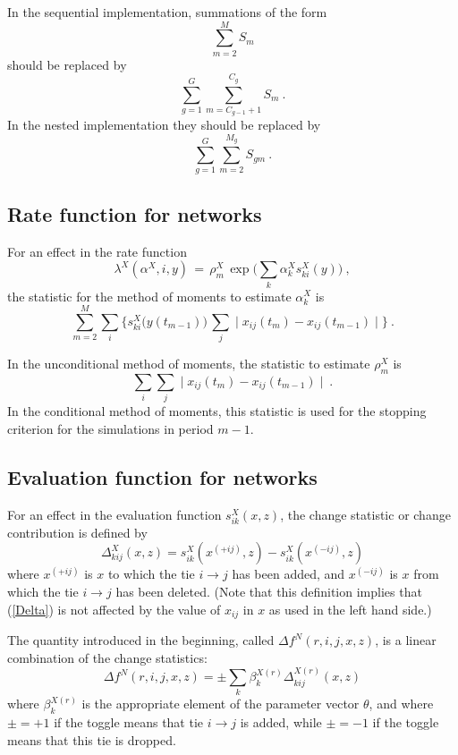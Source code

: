 \documentclass[a4paper,12pt,fleqn]{article}
\begin{document}
In the sequential implementation, summations of the form
\[
\sum_{m=2}^M S_m
\]
should be replaced by
\[
\sum_{g=1}^G \sum_{m=C_{g-1}+1}^{C_g} S_m \ .
\]
In the nested implementation they should be replaced by
\[
\sum_{g=1}^G \sum_{m=2}^{M_g} S_{gm} \ .
\]


\subsection{Rate function for networks}

For an effect in the rate function
\begin{equation}
 \lambda^X(\alpha^X, i, y) \,=\, \rho^X_m \,
      \exp\Big(\sum_k \alpha^X_k s^X_{ki}(y) \Big) \ ,
               \label{ratef}
\end{equation}
the statistic for the method of moments to estimate $\alpha_k^X$ is
\begin{equation}
\sum_{m=2}^M  \sum_i \bigg\{ s^X_{ki}\big(y(t_{m-1})\big) \,
         \sum_j \mid x_{ij}(t_m) - x_{ij}(t_{m-1}) \mid  \bigg\} \ .
               \label{ratestat}
\end{equation}

In the unconditional method of moments, the statistic to estimate
$\rho^X_m$ is
\begin{equation}
 \sum_i \sum_j \mid x_{ij}(t_m) - x_{ij}(t_{m-1}) \mid  \ .
               \label{rhostat}
\end{equation}
In the conditional method of moments, this statistic is used for
the stopping criterion for the simulations in period $m-1$.

\subsection{Evaluation function for networks}

For an effect in the evaluation function
$s_{ik}^X(x,z)$, the change statistic or change contribution is defined by
\begin{equation}
\Delta_{kij}^X(x,z) = s_{ik}^X(x^{(+ij)},z) - s_{ik}^X(x^{(-ij)},z) \label{Delta}
\end{equation}
where $x^{(+ij)}$ is $x$ to which the tie $i \rightarrow j$ has been added, and
 $x^{(-ij)}$ is $x$ from which the tie $i \rightarrow j$ has been deleted.
 (Note that this definition implies that (\ref{Delta}) is not affected by the value
 of $x_{ij}$ in  $x$ as used in the left hand side.)

The quantity introduced in the beginning, called $\Delta f^N(r,i,j,x,z)$,
is a linear combination of the change statistics:
\begin{equation}
\Delta f^N(r,i,j,x,z) = \pm  \sum_k \beta^{X(r)}_k \Delta_{kij}^{X(r)}(x,z) \label{eq:Deltaf}
\end{equation}
where $\beta^{X(r)}_k$ is the appropriate element of the parameter vector $\theta$,
and where $\pm = +1$ if the toggle means that tie  $i \rightarrow j$ is added,
while $\pm = -1$ if the toggle means that this tie is dropped.
\end{document}
